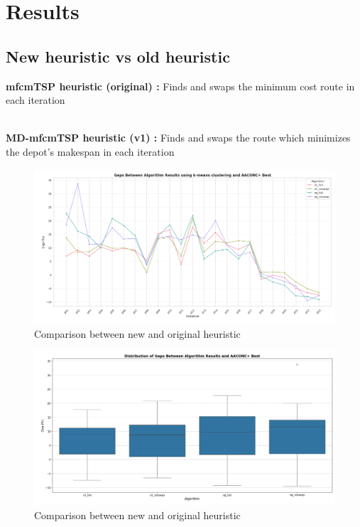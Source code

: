 \documentclass{article}
\begin{document}
	\onecolumn
	\section{Results}
	\subsection{New heuristic vs old heuristic}
	\textbf{mfcmTSP heuristic (original) : } Finds and swaps the minimum cost route in each iteration \\ \;
	\\
	\par
	\textbf{MD-mfcmTSP heuristic (v1) : } Finds and swaps the route which minimizes the depot's makespan in each iteration \\ \;
	\begin{figure}[hb!]
		\centering
		\caption{Comparison between new and original heuristic}
		\includegraphics[width=\textwidth]{heuristics_comp_gaps_lineGraph_kmeans}
	\end{figure}
	\begin{figure}[hb!]
		\centering
		\caption{Comparison between new and original heuristic}
		\includegraphics[width=\textwidth]{heuristics_comp_gaps_boxGraph_kmeans}
	\end{figure}
\end{document}
